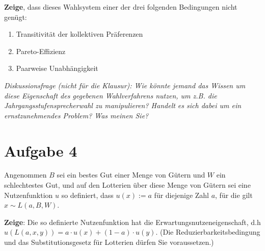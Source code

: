 \documentclass[12pt, a4paper, german]{article}
\begin{document}
{\bf Zeige}, dass dieses Wahlsystem einer der drei folgenden Bedingungen nicht
genügt:
\begin{enumerate}
  \item Transitivität der kollektiven Präferenzen
  \item Pareto-Effizienz
  \item Paarweise Unabhängigkeit
\end{enumerate}

{\em Diskussionsfrage (nicht für die Klausur): Wie könnte jemand das Wissen um
diese Eigenschaft des gegebenen Wahlverfahrens nutzen, um z.B. die
Jahrgangsstufensprecherwahl zu manipulieren? Handelt es sich dabei um ein
ernstzunehmendes Problem? Was meinen Sie?}

\section{Aufgabe 4}

Angenommen $B$ sei ein bestes Gut einer Menge von Gütern und $W$ ein
schlechtestes Gut, und auf den Lotterien über diese Menge von Gütern sei eine
Nutzenfunktion $u$ so definiert, dass $u(x) := a$ für diejenige Zahl $a$, für
die gilt $x \sim L(a,B,W)$. 

{\bf Zeige}: Die so definierte Nutzenfunktion hat die
Erwartungsnutzeneigenschaft, d.h $u(L(a,x,y)) = a\cdot u(x) + (1-a)\cdot u(y)$.
(Die Reduzierbarkeitsbedingung und das
Substitutionsgesetz für Lotterien dürfen Sie voraussetzen.)
\end{document}
